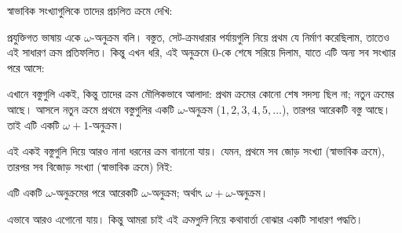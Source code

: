 \documentclass[../../../include/open-logic-section]{subfiles}
\begin{document}

স্বাভাবিক সংখ্যাগুলিকে তাদের প্রচলিত ক্রমে দেখি:
\begin{center}
\end{center}
প্রযুক্তিগত ভাষায় একে $\omega$-অনুক্রম বলি।
বস্তুত, সেট-ক্রমধারার পর্যায়গুলি নিয়ে প্রথম যে
নির্মাণ করেছিলাম, তাতেও এই সাধারণ ক্রম প্রতিফলিত।
কিন্তু এখন ধরি, এই অনুক্রমে $0$-কে শেষে সরিয়ে দিলাম,
যাতে এটি অন্য সব সংখ্যার পরে আসে:
\begin{center}
\end{center}
এখানে বস্তুগুলি একই, কিন্তু তাদের ক্রম মৌলিকভাবে
আলাদা: প্রথম ক্রমের কোনো শেষ সদস্য ছিল না; নতুন
ক্রমের আছে। আসলে নতুন ক্রমে প্রথমে বস্তুগুলির একটি
$\omega$-অনুক্রম ($1, 2, 3, 4, 5, \ldots$), তারপর
আরেকটি বস্তু আছে। তাই এটি একটি $\omega+1$-অনুক্রম।

এই একই বস্তুগুলি দিয়ে আরও নানা ধরনের ক্রম বানানো
যায়। যেমন, প্রথমে সব জোড় সংখ্যা (স্বাভাবিক ক্রমে),
তারপর সব বিজোড় সংখ্যা (স্বাভাবিক ক্রমে) নিই:
\begin{center}
\end{center}
এটি একটি $\omega$-অনুক্রমের পরে আরেকটি
$\omega$-অনুক্রম; অর্থাৎ $\omega+\omega$-অনুক্রম।

এভাবে আরও এগোনো যায়। কিন্তু আমরা চাই এই
\emph{ক্রমগুলি} নিয়ে কথাবার্তা বোঝার একটি সাধারণ
পদ্ধতি।
\end{document}
